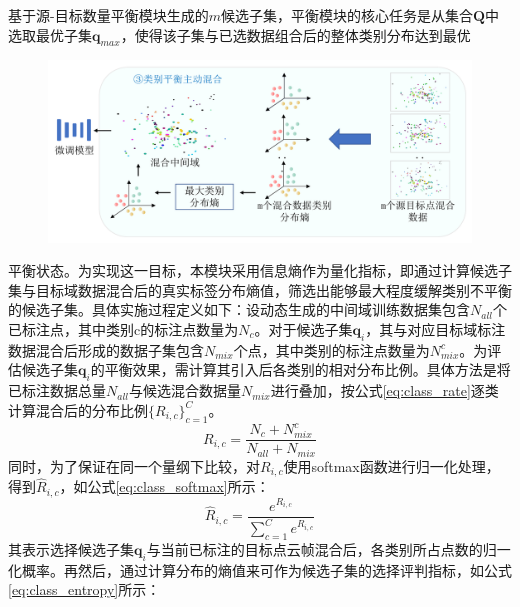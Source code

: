     基于源-目标数量平衡模块生成的$m$候选子集，平衡模块的核心任务是从集合$\mathbf{Q}$中选取最优子集$\mathbf{q}_{max}$，使得该子集与已选数据组合后的整体类别分布达到最优
    \begin{figure}[h]
        \centering
        \includegraphics[width = \textwidth, scale=0.5]{ljx/figure/4-3am.pdf}
        \label{fig:4-3}
    \end{figure}
    平衡状态。为实现这一目标，本模块采用信息熵作为量化指标，即通过计算候选子集与目标域数据混合后的真实标签分布熵值，筛选出能够最大程度缓解类别不平衡的候选子集。具体实施过程定义如下：设动态生成的中间域训练数据集包含$N_{all}$个已标注点，其中类别c的标注点数量为$N_c$。对于候选子集$\mathbf{q}_i$，其与对应目标域标注数据混合后形成的数据子集包含$N_{mix}$个点，其中类别的标注点数量为$N_{mix}^c$。为评估候选子集$\mathbf{q}_i$的平衡效果，需计算其引入后各类别的相对分布比例。具体方法是将已标注数据总量$N_{all}$与候选混合数据量$N_{mix}$进行叠加，按公式\eqref{eq:class_rate}逐类计算混合后的分布比例$\{R_{i,c}\}^C_{c=1}$。%
    \begin{equation}
        \label{eq:class_rate}
        R_{i,c} = \frac{N_c+N^c_{mix}}{N_{all}+N_{mix}}
    \end{equation}
    同时，为了保证在同一个量纲下比较，对$R_{i,c}$使用softmax函数进行归一化处理，得到$\hat{R}_{i,c}$，如公式\eqref{eq:class_softmax}所示：
    \begin{equation}
        \label{eq:class_softmax}
        \hat{R}_{i,c}=\frac{e^{R_{i,c}}}{\sum^C_{c=1}e^{R_{i,c}}}
    \end{equation}
    其表示选择候选子集$\mathbf{q}_i$与当前已标注的目标点云帧混合后，各类别所占点数的归一化概率。再然后，通过计算分布的熵值来可作为候选子集的选择评判指标，如公式\eqref{eq:class_entropy}所示：
